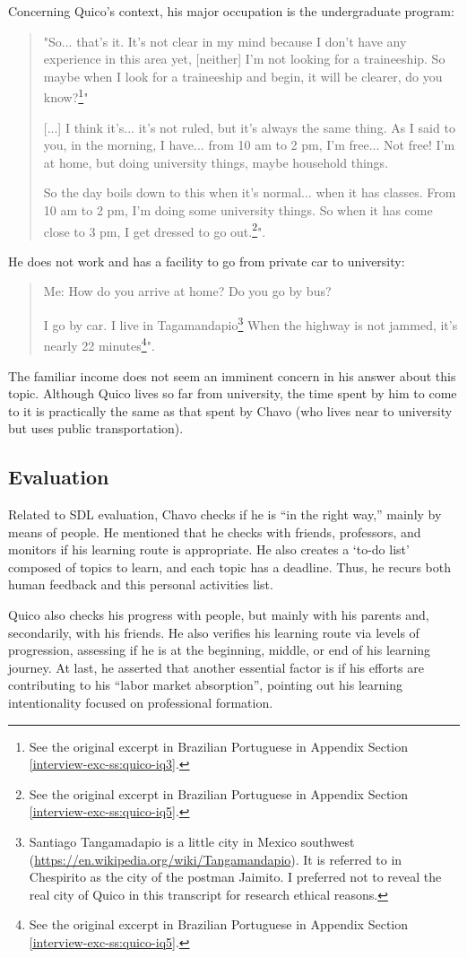 Concerning Quico's context, his major occupation is the undergraduate program: 
\begin{quote}
    "So... that's it. It's not clear in my mind because I don't have any experience in this area yet, [neither] I'm not looking for a traineeship. So maybe when I look for a traineeship and begin, it will be clearer, do you know?\footnote{See the original excerpt in Brazilian Portuguese in Appendix Section \ref{interview-exc-ss:quico-iq3}.}"

    [...] I think it's... it's not ruled, but it's always the same thing. As I said to you, in the morning, I have... from 10 am to 2 pm, I'm free... Not free! I'm at home, but doing university things, maybe household things.

    So the day boils down to this when it's normal... when it has classes. From 10 am to 2 pm, I'm doing some university things. So when it has come close to 3 pm, I get dressed to go out.\footnote{See the original excerpt in Brazilian Portuguese in Appendix Section \ref{interview-exc-ss:quico-iq5}.}".
\end{quote}
He does not work and has a facility to go from private car to university:
\begin{quote}
    \colorbox{black!15}{Me: How do you arrive at home? Do you go by bus?}

    I go by car. I live in Tagamandapio\footnote{Santiago Tangamadapio is a little city in Mexico southwest (\url{https://en.wikipedia.org/wiki/Tangamandapio}). It is referred to in Chespirito as the city of the postman Jaimito. I preferred not to reveal the real city of Quico in this transcript for research ethical reasons.} When the highway is not jammed, it's nearly 22 minutes\footnote{See the original excerpt in Brazilian Portuguese in Appendix Section \ref{interview-exc-ss:quico-iq5}.}".
\end{quote}
The familiar income does not seem an imminent concern in his answer about this topic. Although Quico lives so far from university, the time spent by him to come to it is practically the same as that spent by Chavo (who lives near to university but uses public transportation).

\subsection{Evaluation}
\label{results-ss:evaluation}

Related to \gls{SDL} evaluation, Chavo checks if he is “in the right way,” mainly by means of people. He mentioned that he checks with friends, professors, and monitors if his learning route is appropriate. He also creates a ‘to-do list’ composed of topics to learn, and each topic has a deadline. Thus, he recurs both human feedback and this personal activities list.

Quico also checks his progress with people, but mainly with his parents and, secondarily, with his friends. He also verifies his learning route via levels of progression, assessing if he is at the beginning, middle, or end of his learning journey. At last, he asserted that another essential factor is if his efforts are contributing to his “labor market absorption”, pointing out his learning intentionality focused on professional formation.
